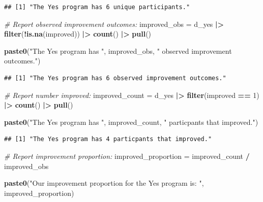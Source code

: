 \documentclass[
]{article}
\newenvironment{Shaded}{\begin{snugshade}}{\end{snugshade}}
\newcommand{\CommentTok}[1]{\textcolor[rgb]{0.56,0.35,0.01}{\textit{#1}}}
\newcommand{\DecValTok}[1]{\textcolor[rgb]{0.00,0.00,0.81}{#1}}
\newcommand{\FunctionTok}[1]{\textcolor[rgb]{0.13,0.29,0.53}{\textbf{#1}}}
\newcommand{\NormalTok}[1]{#1}
\newcommand{\OtherTok}[1]{\textcolor[rgb]{0.56,0.35,0.01}{#1}}
\newcommand{\SpecialCharTok}[1]{\textcolor[rgb]{0.81,0.36,0.00}{\textbf{#1}}}
\newcommand{\StringTok}[1]{\textcolor[rgb]{0.31,0.60,0.02}{#1}}
\begin{document}
\begin{verbatim}
## [1] "The Yes program has 6 unique participants."
\end{verbatim}

\begin{Shaded}
\begin{Highlighting}[]
\CommentTok{\# Report observed improvement outcomes:}
\NormalTok{improved\_obs }\OtherTok{=}\NormalTok{ d\_yes }\SpecialCharTok{|\textgreater{}} 
  \FunctionTok{filter}\NormalTok{(}\SpecialCharTok{!}\FunctionTok{is.na}\NormalTok{(improved)) }\SpecialCharTok{|\textgreater{}} 
  \FunctionTok{count}\NormalTok{() }\SpecialCharTok{|\textgreater{}} 
  \FunctionTok{pull}\NormalTok{()}

\FunctionTok{paste0}\NormalTok{(}\StringTok{"The Yes program has "}\NormalTok{, improved\_obs, }\StringTok{" observed improvement outcomes."}\NormalTok{)}
\end{Highlighting}
\end{Shaded}

\begin{verbatim}
## [1] "The Yes program has 6 observed improvement outcomes."
\end{verbatim}

\begin{Shaded}
\begin{Highlighting}[]
\CommentTok{\# Report number improved:}
\NormalTok{improved\_count }\OtherTok{=}\NormalTok{ d\_yes }\SpecialCharTok{|\textgreater{}} 
  \FunctionTok{filter}\NormalTok{(improved }\SpecialCharTok{==} \DecValTok{1}\NormalTok{) }\SpecialCharTok{|\textgreater{}} 
  \FunctionTok{count}\NormalTok{() }\SpecialCharTok{|\textgreater{}} 
  \FunctionTok{pull}\NormalTok{()}

\FunctionTok{paste0}\NormalTok{(}\StringTok{"The Yes program has "}\NormalTok{, improved\_count, }\StringTok{" particpants that improved."}\NormalTok{)}
\end{Highlighting}
\end{Shaded}

\begin{verbatim}
## [1] "The Yes program has 4 particpants that improved."
\end{verbatim}

\begin{Shaded}
\begin{Highlighting}[]
\CommentTok{\# Report improvement proportion:}
\NormalTok{improved\_proportion }\OtherTok{=}\NormalTok{ improved\_count }\SpecialCharTok{/}\NormalTok{ improved\_obs }

\FunctionTok{paste0}\NormalTok{(}\StringTok{"Our improvement proportion for the Yes program is: "}\NormalTok{, improved\_proportion)}
\end{Highlighting}
\end{Shaded}
\end{document}
